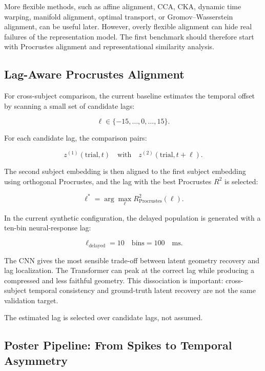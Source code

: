 \documentclass[11pt]{article}
\begin{document}
More flexible methods, such as affine alignment, CCA, CKA, dynamic time
warping, manifold alignment, optimal transport, or Gromov--Wasserstein
alignment, can be useful later. However, overly flexible alignment can hide real
failures of the representation model. The first benchmark should therefore
start with Procrustes alignment and representational similarity analysis.

\subsection{Lag-Aware Procrustes Alignment}

For cross-subject comparison, the current baseline estimates the temporal
offset by scanning a small set of candidate lags:

\begin{equation}
\ell \in \{-15,\dots,0,\dots,15\}.
\end{equation}

For each candidate lag, the comparison pairs:

\begin{equation}
z^{(1)}(\text{trial},t)
\quad \text{with} \quad
z^{(2)}(\text{trial},t+\ell).
\end{equation}

The second subject embedding is then aligned to the first subject embedding
using orthogonal Procrustes, and the lag with the best Procrustes $R^2$ is
selected:

\begin{equation}
\ell^\ast =
\arg\max_{\ell} R^2_{\text{Procrustes}}(\ell).
\end{equation}

In the current synthetic configuration, the delayed population is generated
with a ten-bin neural-response lag:

\begin{equation}
\ell_{\text{delayed}} = 10 \quad \text{bins} = 100 \quad \text{ms}.
\end{equation}

The CNN gives the most sensible trade-off between latent geometry recovery and
lag localization. The Transformer can peak at the correct lag while producing a
compressed and less faithful geometry. This dissociation is important:
cross-subject temporal consistency and ground-truth latent recovery are not the
same validation target.

The estimated lag is selected over candidate lags, not assumed.


\subsection{Poster Pipeline: From Spikes to Temporal Asymmetry}
\end{document}
